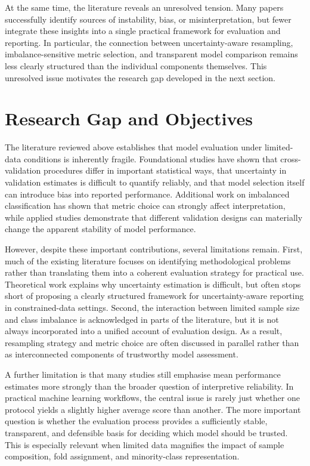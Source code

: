 \documentclass[11pt,a4paper]{article}
\begin{document}
At the same time, the literature reveals an unresolved tension. Many papers successfully identify sources of instability, bias, or misinterpretation, but fewer integrate these insights into a single practical framework for evaluation and reporting. In particular, the connection between uncertainty-aware resampling, imbalance-sensitive metric selection, and transparent model comparison remains less clearly structured than the individual components themselves. This unresolved issue motivates the research gap developed in the next section.

\section{Research Gap and Objectives}

The literature reviewed above establishes that model evaluation under limited-data conditions is inherently fragile. Foundational studies have shown that cross-validation procedures differ in important statistical ways, that uncertainty in validation estimates is difficult to quantify reliably, and that model selection itself can introduce bias into reported performance. Additional work on imbalanced classification has shown that metric choice can strongly affect interpretation, while applied studies demonstrate that different validation designs can materially change the apparent stability of model performance.

However, despite these important contributions, several limitations remain. First, much of the existing literature focuses on identifying methodological problems rather than translating them into a coherent evaluation strategy for practical use. Theoretical work explains why uncertainty estimation is difficult, but often stops short of proposing a clearly structured framework for uncertainty-aware reporting in constrained-data settings. Second, the interaction between limited sample size and class imbalance is acknowledged in parts of the literature, but it is not always incorporated into a unified account of evaluation design. As a result, resampling strategy and metric choice are often discussed in parallel rather than as interconnected components of trustworthy model assessment.

A further limitation is that many studies still emphasise mean performance estimates more strongly than the broader question of interpretive reliability. In practical machine learning workflows, the central issue is rarely just whether one protocol yields a slightly higher average score than another. The more important question is whether the evaluation process provides a sufficiently stable, transparent, and defensible basis for deciding which model should be trusted. This is especially relevant when limited data magnifies the impact of sample composition, fold assignment, and minority-class representation.
\end{document}
